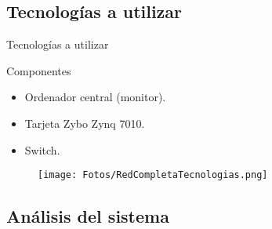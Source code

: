 \documentclass[aspectratio=169]{beamer}
\begin{document}
\subsection{Tecnologías a utilizar}
\begin{frame}{Tecnologías a utilizar}
\begin{block}{Componentes}
	\begin{itemize}
		\item Ordenador central (monitor).
		\item Tarjeta Zybo Zynq 7010.
		\item Switch.
	\end{itemize}
\end{block}
\begin{figure}[h]
\centering
\texttt{[image: Fotos/RedCompletaTecnologias.png]}
\end{figure}
\end{frame}

\subsection{Análisis del sistema}
\end{document}
